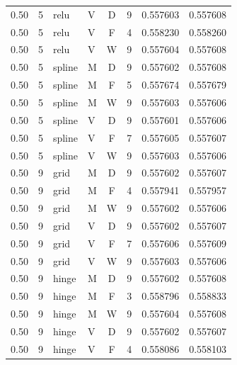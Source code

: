 \begin{longtable}{rrllcrrr}
0.50 & 5 & relu & V & D & 9 & 0.557603 & 0.557608 \\

0.50 & 5 & relu & V & F & 4 & 0.558230 & 0.558260 \\

0.50 & 5 & relu & V & W & 9 & 0.557604 & 0.557608 \\

0.50 & 5 & spline & M & D & 9 & 0.557602 & 0.557608 \\

0.50 & 5 & spline & M & F & 5 & 0.557674 & 0.557679 \\

0.50 & 5 & spline & M & W & 9 & 0.557603 & 0.557606 \\

0.50 & 5 & spline & V & D & 9 & 0.557601 & 0.557606 \\

0.50 & 5 & spline & V & F & 7 & 0.557605 & 0.557607 \\

0.50 & 5 & spline & V & W & 9 & 0.557603 & 0.557606 \\

0.50 & 9 & grid & M & D & 9 & 0.557602 & 0.557607 \\

0.50 & 9 & grid & M & F & 4 & 0.557941 & 0.557957 \\

0.50 & 9 & grid & M & W & 9 & 0.557602 & 0.557606 \\

0.50 & 9 & grid & V & D & 9 & 0.557602 & 0.557607 \\

0.50 & 9 & grid & V & F & 7 & 0.557606 & 0.557609 \\

0.50 & 9 & grid & V & W & 9 & 0.557603 & 0.557606 \\

0.50 & 9 & hinge & M & D & 9 & 0.557602 & 0.557608 \\

0.50 & 9 & hinge & M & F & 3 & 0.558796 & 0.558833 \\

0.50 & 9 & hinge & M & W & 9 & 0.557604 & 0.557608 \\

0.50 & 9 & hinge & V & D & 9 & 0.557602 & 0.557607 \\

0.50 & 9 & hinge & V & F & 4 & 0.558086 & 0.558103 \\


\end{longtable}
